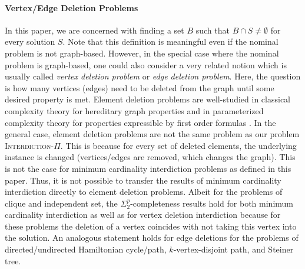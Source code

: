 \paragraph*{Vertex/Edge Deletion Problems}
In this paper, we are concerned with finding a set $B$ such that $B \cap S \neq \emptyset$ for every solution $S$.
Note that this definition is meaningful even if the nominal problem is not graph-based.
However, in the special case where the nominal problem is graph-based, one could also consider a very related notion which is usually called \emph{vertex deletion problem} or \emph{edge deletion problem}.
Here, the question is how many vertices (edges) need to be deleted from the graph until some desired property is met.
Element deletion problems are well-studied in classical complexity theory for hereditary graph properties \cite{DBLP:journals/jcss/LewisY80} and in parameterized complexity theory for properties expressible by first order formulas \cite{DBLP:conf/mfcs/BannachCT24}.
In the general case, element deletion problems are not the same problem as our problem \textsc{Interdiction-$\Pi$}.
This is because for every set of deleted elements, the underlying instance is changed (vertices/edges are removed, which changes the graph). This is not the case for minimum cardinality interdiction problems as defined in this paper.
Thus, it is not possible to transfer the results of minimum cardinality interdiction directly to element deletion problems.
Albeit for the problems of clique and independent set, the $\Sigma^p_2$-completeness results hold for both minimum cardinality interdiction as well as for vertex deletion interdiction 
because for these problems the deletion of a vertex coincides with not taking this vertex into the solution. 
An analogous statement holds for edge deletions for the problems of directed/undirected Hamiltonian cycle/path, $k$-vertex-disjoint path, and Steiner tree.
